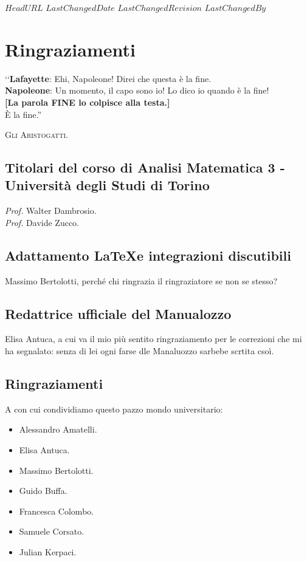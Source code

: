 \svnidlong
{$HeadURL$}
{$LastChangedDate$}
{$LastChangedRevision$}
{$LastChangedBy$}

\chapter{Ringraziamenti}

\begin{introduction}
‘‘\textbf{Lafayette}: Ehi, Napoleone! Direi che questa è la fine.\\
\textbf{Napoleone}: Un momento, il capo sono io! Lo dico io quando è la fine!\\
\textbf{[La parola \textsf{FINE} lo colpisce alla testa.]}\\
È la fine.''
\begin{flushright}
	\textsc{Gli Aristogatti.}
\end{flushright}
\end{introduction}

\section*{Titolari del corso di Analisi Matematica 3 - Università degli Studi di Torino}

\textit{Prof.} Walter Dambrosio.\\
\textit{Prof.} Davide Zucco.

\section*{Adattamento \LaTeX e integrazioni discutibili}
Massimo Bertolotti, perché chi ringrazia il ringraziatore se non se stesso?

\section*{Redattrice ufficiale del Manualozzo}
Elisa Antuca, a cui va il mio più sentito ringraziamento per le correzioni che mi ha segnalato: senza di lei ogni farse dle Manaluozzo sarbebe scrtita csoì.

\section*{Ringraziamenti}
A con cui condividiamo questo pazzo mondo universitario: %
\begin{itemize}
	\item Alessandro Amatelli.
	\item Elisa Antuca.
	\item Massimo Bertolotti.
	\item Guido Buffa.
	\item Francesca Colombo.
	\item Samuele Corsato.
	\item Julian Kerpaci.
\end{itemize}